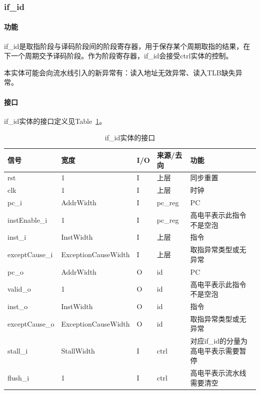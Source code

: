 \documentclass{article}
\begin{document}
\begin{spacing}{1.4}
\subsubsection{if\_id}

\paragraph{功能}\mbox{}

if\_id是取指阶段与译码阶段间的阶段寄存器，用于保存某个周期取指的结果，在下一个周期交予译码阶段。作为阶段寄存器，if\_id会接受ctrl实体的控制。

本实体可能会向流水线引入的新异常有：读入地址无效异常、读入TLB缺失异常。

\paragraph{接口}\mbox{}

if\_id实体的接口定义见Table~\ref{tb:ifid-interface}。
\begin{table}[!htb]
\begin{center}
\begin{tabular*}{15cm}{l|l|l|l|p{5cm}}
\hline
\textbf{信号}&\textbf{宽度}&\textbf{I/O}&\textbf{来源/去向}&\textbf{功能} \\
\hline rst                     & 1                      & I     & 上层          & 同步重置 \\
\hline clk                     & 1                      & I     & 上层          & 时钟 \\
\hline pc\_i                   & AddrWidth              & I     & pc\_reg       & PC \\
\hline instEnable\_i           & 1                      & I     & pc\_reg       & 高电平表示此指令不是空泡 \\
\hline inst\_i                 & InstWidth              & I     & 上层          & 指令 \\
\hline exceptCause\_i          & ExceptionCauseWidth    & I     & 上层          & 取指异常类型或无异常 \\
\hline pc\_o                   & AddrWidth              & O     & id            & PC \\
\hline valid\_o                & 1                      & O     & id            & 高电平表示此指令不是空泡 \\
\hline inst\_o                 & InstWidth              & O     & id            & 指令 \\
\hline exceptCause\_o          & ExceptionCauseWidth    & O     & id            & 取指异常类型或无异常 \\
\hline stall\_i                & StallWidth             & I     & ctrl          & 对应if\_id的分量为高电平表示需要暂停 \\
\hline flush\_i                & 1                      & I     & ctrl          & 高电平表示流水线需要清空 \\
\hline
\end{tabular*}
\caption{if\_id实体的接口}
\label{tb:ifid-interface}
\end{center}
\end{table}


\end{spacing}
\end{document}
